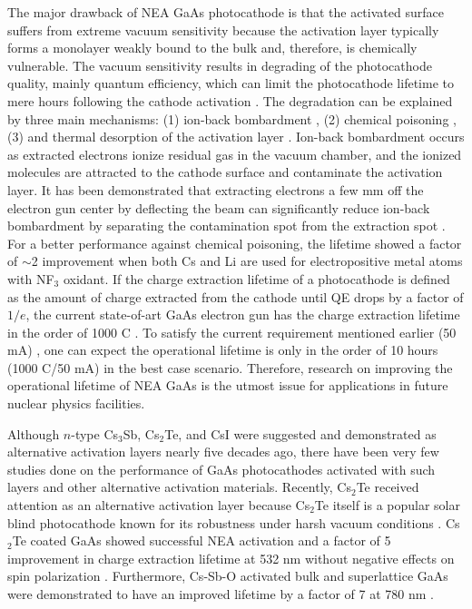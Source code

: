 The major drawback of NEA GaAs photocathode is that the activated surface suffers from extreme vacuum sensitivity because the activation layer typically forms a monolayer weakly bound to the bulk and, therefore, is chemically vulnerable. The vacuum sensitivity results in degrading of the photocathode quality, mainly quantum efficiency, which can limit the photocathode lifetime to mere hours following the cathode activation \cite{bae2018_RuggedSpinpolarizedElectron}. The degradation can be explained by three main mechanisms: (1) ion-back bombardment \cite{grames2011_ChargeFluenceLifetime}, (2) chemical poisoning \cite{chanlek2014_DegradationQuantumEfficiency}, (3) and thermal desorption of the activation layer \cite{kuriki2011_DarklifetimeDegradationGaAs}. Ion-back bombardment occurs as extracted electrons ionize residual gas in the vacuum chamber, and the ionized molecules are attracted to the cathode surface and contaminate the activation layer. It has been demonstrated that extracting electrons a few mm off the electron gun center by deflecting the beam can significantly reduce ion-back bombardment by separating the contamination spot from the extraction spot \cite{grames2011_ChargeFluenceLifetime}. For a better performance against chemical poisoning, the lifetime showed a factor of $\sim$2 improvement when both Cs and Li are used for electropositive metal atoms with NF$_3$ oxidant. If the charge extraction lifetime of a photocathode is defined as the amount of charge extracted from the cathode until QE drops by a factor of $1/e$, the current state-of-art GaAs electron gun has the charge extraction lifetime in the order of 1000 C \cite{grames2011_ChargeFluenceLifetime}. To satisfy the current requirement mentioned earlier (50 mA) \cite{NASreport}, one can expect the operational lifetime is only in the order of 10 hours (1000 C/50 mA) in the best case scenario. Therefore, research on improving the operational lifetime of NEA GaAs is the utmost issue for applications in future nuclear physics facilities.
	 
Although $n$-type Cs$_3$Sb, Cs$_2$Te, and CsI were suggested \cite{sonnenberg1969,sonnenberg1969Cs} and demonstrated \cite{guo1996,hagino1969,zhao1993} as alternative activation layers nearly five decades ago, there have been very few studies done on the performance of GaAs photocathodes activated with such layers and other alternative activation materials. Recently, Cs$_2$Te received attention as an alternative activation layer because Cs$_2$Te itself is a popular solar blind photocathode known for its robustness under harsh vacuum conditions \cite{michelato2008_Cs2TePHOTOCATHODESROBUSTNESS}. Cs$_2$Te coated GaAs showed successful NEA activation \cite{sugiyama2011_StudyElectronAffinity, uchida2014_STUDYROBUSTNESSNEAGAAS,kuriki2015_GaAsPhotocathodeActivation} and a factor of 5 improvement in charge extraction lifetime at 532 nm without negative effects on spin polarization \cite{bae2018_RuggedSpinpolarizedElectron}. Furthermore, Cs-Sb-O activated bulk and superlattice GaAs were demonstrated to have an improved lifetime by a factor of 7 at 780 nm \cite{bae2020_ImprovedLifetimeHigh,cultrera2020_LongLifetimePolarized}.

